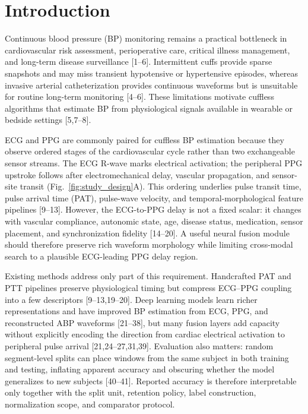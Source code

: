 \documentclass[preprint,12pt]{elsarticle}
\begin{document}
\section{Introduction}

Continuous blood pressure (BP) monitoring remains a practical bottleneck in cardiovascular risk assessment, perioperative care, critical illness management, and long-term disease surveillance [1--6]. Intermittent cuffs provide sparse snapshots and may miss transient hypotensive or hypertensive episodes, whereas invasive arterial catheterization provides continuous waveforms but is unsuitable for routine long-term monitoring [4--6]. These limitations motivate cuffless algorithms that estimate BP from physiological signals available in wearable or bedside settings [5,7--8].

ECG and PPG are commonly paired for cuffless BP estimation because they observe ordered stages of the cardiovascular cycle rather than two exchangeable sensor streams. The ECG R-wave marks electrical activation; the peripheral PPG upstroke follows after electromechanical delay, vascular propagation, and sensor-site transit (Fig.~\ref{fig:study_design}A). This ordering underlies pulse transit time, pulse arrival time (PAT), pulse-wave velocity, and temporal-morphological feature pipelines [9--13]. However, the ECG-to-PPG delay is not a fixed scalar: it changes with vascular compliance, autonomic state, age, disease status, medication, sensor placement, and synchronization fidelity [14--20]. A useful neural fusion module should therefore preserve rich waveform morphology while limiting cross-modal search to a plausible ECG-leading PPG delay region.

Existing methods address only part of this requirement. Handcrafted PAT and PTT pipelines preserve physiological timing but compress ECG--PPG coupling into a few descriptors [9--13,19--20]. Deep learning models learn richer representations and have improved BP estimation from ECG, PPG, and reconstructed ABP waveforms [21--38], but many fusion layers add capacity without explicitly encoding the direction from cardiac electrical activation to peripheral pulse arrival [21,24--27,31,39]. Evaluation also matters: random segment-level splits can place windows from the same subject in both training and testing, inflating apparent accuracy and obscuring whether the model generalizes to new subjects [40--41]. Reported accuracy is therefore interpretable only together with the split unit, retention policy, label construction, normalization scope, and comparator protocol.
\end{document}
